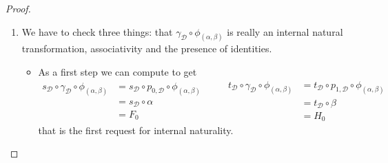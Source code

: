 \documentclass[a4paper,UKenglish,cleveref,pdftex,thm-restate,numberwithinsect]{lipics-v2021}
\begin{document}
		
	\begin{proof}
		\begin{enumerate}
			\item We have to check three things: that $\gamma_{\mathcal{D}}\circ \phi_{(\alpha, \beta)}$ is really an internal natural transformation, associativity and the presence of identities.
			\begin{itemize}
				\item As a first step we can compute to get
				\[\begin{split}
					s_{\mathcal{D}}\circ \gamma_{\mathcal{D}} \circ \phi_{(\alpha, \beta)}&=s_{\mathcal{D}}\circ p_{0, \mathcal{D}}\circ \phi_{(\alpha, \beta)}\\&= s_{\mathcal{D}} \circ \alpha\\&= F_0
				\end{split} \qquad  \begin{split}
				t_{\mathcal{D}}\circ \gamma_{\mathcal{D}} \circ \phi_{(\alpha, \beta)}&=t_{\mathcal{D}}\circ p_{1, \mathcal{D}}\circ \phi_{(\alpha, \beta)}\\&= t_{\mathcal{D}} \circ \beta\\&= H_0
				\end{split}\]
				that is the first request for internal naturality.
				

\end{itemize}
\end{enumerate}
\end{proof}
\end{document}
